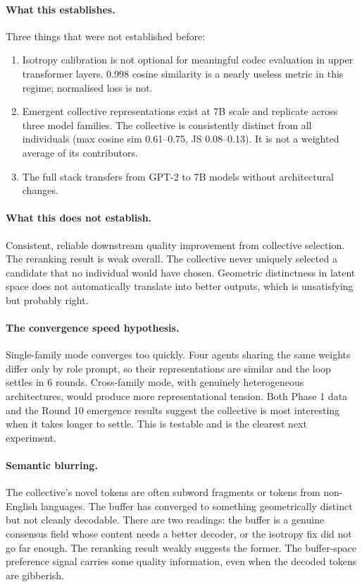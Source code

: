 \documentclass[10pt,twocolumn]{article}
\begin{document}
\paragraph{What this establishes.}
Three things that were not established before:

\begin{enumerate}
    \item Isotropy calibration is not optional for meaningful codec evaluation in upper transformer layers. 0.998 cosine similarity is a nearly useless metric in this regime; normalised loss is not.

    \item Emergent collective representations exist at 7B scale and replicate across three model families. The collective is consistently distinct from all individuals (max cosine sim 0.61--0.75, JS 0.08--0.13). It is not a weighted average of its contributors.

    \item The full stack transfers from GPT-2 to 7B models without architectural changes.
\end{enumerate}

\paragraph{What this does not establish.}
Consistent, reliable downstream quality improvement from collective selection. The reranking result is weak overall. The collective never uniquely selected a candidate that no individual would have chosen. Geometric distinctness in latent space does not automatically translate into better outputs, which is unsatisfying but probably right.

\paragraph{The convergence speed hypothesis.}
Single-family mode converges too quickly. Four agents sharing the same weights differ only by role prompt, so their representations are similar and the loop settles in 6 rounds. Cross-family mode, with genuinely heterogeneous architectures, would produce more representational tension. Both Phase 1 data and the Round 10 emergence results suggest the collective is most interesting when it takes longer to settle. This is testable and is the clearest next experiment.

\paragraph{Semantic blurring.}
The collective's novel tokens are often subword fragments or tokens from non-English languages. The buffer has converged to something geometrically distinct but not cleanly decodable. There are two readings: the buffer is a genuine consensus field whose content needs a better decoder, or the isotropy fix did not go far enough. The reranking result weakly suggests the former. The buffer-space preference signal carries some quality information, even when the decoded tokens are gibberish.
\end{document}
